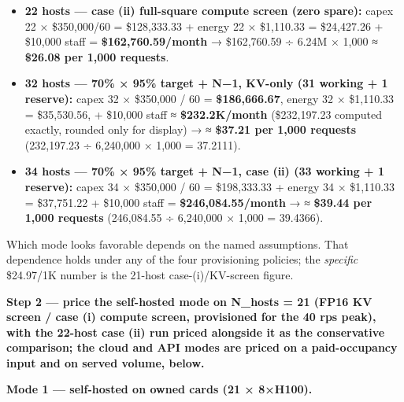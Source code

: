 \begin{itemize}
\tightlist
\item
  \textbf{22 hosts --- case (ii) full-square compute screen (zero
  spare):} capex 22 × \$350,000/60 = \$128,333.33 + energy 22 ×
  \$1,110.33 = \$24,427.26 + \$10,000 staff =
  \textbf{\$162,760.59/month} → \$162,760.59 ÷ 6.24M × 1,000 ≈
  \textbf{\$26.08 per 1,000 requests}.
\item
  \textbf{32 hosts --- 70\% × 95\% target + N−1, KV-only (31 working + 1
  reserve):} capex 32 × \$350,000 / 60 = \textbf{\$186,666.67}, energy
  32 × \$1,110.33 = \$35,530.56, + \$10,000 staff ≈
  \textbf{\$232.2K/month} (\$232,197.23 computed exactly, rounded only
  for display) → ≈ \textbf{\$37.21 per 1,000 requests} (232,197.23 ÷
  6,240,000 × 1,000 = 37.2111).
\item
  \textbf{34 hosts --- 70\% × 95\% target + N−1, case (ii) (33 working +
  1 reserve):} capex 34 × \$350,000 / 60 = \$198,333.33 + energy 34 ×
  \$1,110.33 = \$37,751.22 + \$10,000 staff =
  \textbf{\$246,084.55/month} → ≈ \textbf{\$39.44 per 1,000 requests}
  (246,084.55 ÷ 6,240,000 × 1,000 = 39.4366).
\end{itemize}

Which mode looks favorable depends on the named assumptions. That
dependence holds under any of the four provisioning policies; the
\emph{specific} \$24.97/1K number is the 21-host case-(i)/KV-screen
figure.

\textbf{Step 2 --- price the self-hosted mode on N\_hosts = 21 (FP16 KV
screen / case (i) compute screen, provisioned for the 40 rps peak), with
the 22-host case (ii) run priced alongside it as the conservative
comparison; the cloud and API modes are priced on a paid-occupancy input
and on served volume, below.}

\textbf{Mode 1 --- self-hosted on owned cards (21 × 8×H100).}

